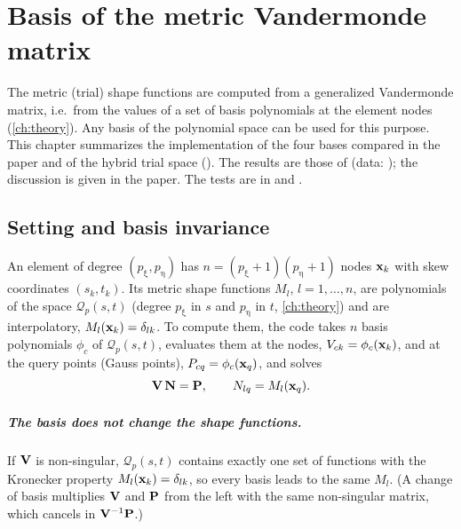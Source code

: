 \chapter{Basis of the metric Vandermonde matrix}
\label{ch:metric-basis}


The metric (trial) shape functions are computed from a generalized Vandermonde
matrix, i.e.\ from the values of a set of basis polynomials at the element nodes
(\cref{ch:theory}). Any basis of the polynomial space can be used for this
purpose. This chapter summarizes the implementation of the four bases compared in
the paper and of the hybrid trial space (). The results are those of
 (data:
); the discussion is given in the paper. The
tests are in  and
.

\section{Setting and basis invariance}

An element of degree $(p_\upxi,p_\upeta)$ has $n=(p_\upxi+1)(p_\upeta+1)$ nodes
$\mathbf{x}_k$ with skew coordinates $(s_k,t_k)$. Its metric shape functions $M_l$,
$l=1,\dots,n$, are polynomials of the space $\mathcal Q_p(s,t)$ (degree $p_\upxi$ in $s$
and $p_\upeta$ in $t$, \cref{ch:theory}) and are interpolatory,
$M_l(\mathbf{x}_k)=\delta_{lk}$. To compute them, the code takes $n$ basis
polynomials $\phi_c$ of $\mathcal Q_p(s,t)$, evaluates them at the nodes,
$V_{ck}=\phi_c(\mathbf{x}_k)$, and at the query points (Gauss points),
$P_{cq}=\phi_c(\mathbf{x}_q)$, and solves
\[
  \mathbf{V}\,\mathbf{N}=\mathbf{P},\qquad N_{lq}=M_l(\mathbf{x}_q).
\]

\paragraph{The basis does not change the shape functions.} If $\mathbf{V}$ is
non-singular, $\mathcal Q_p(s,t)$ contains exactly one set of functions with the
Kronecker property $M_l(\mathbf{x}_k)=\delta_{lk}$, so every basis leads to the same
$M_l$. (A change of basis multiplies $\mathbf{V}$ and $\mathbf{P}$ from the left with
the same non-singular matrix, which cancels in $\mathbf{V}^{-1}\mathbf{P}$.)

